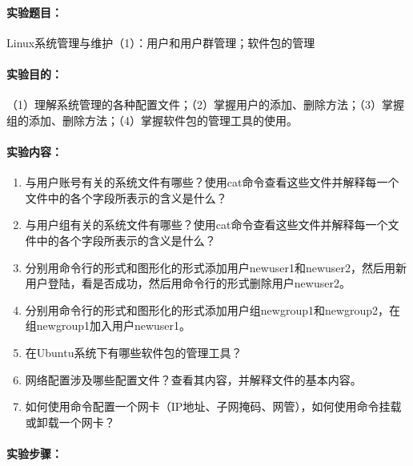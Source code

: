 \documentclass[cs4size,a4paper,nofonts]{ctexart}
\def\titlec{Linux系统管理与维护（1）：用户和用户群管理；软件包的管理}
\begin{document}




\paragraph{实验题目：}\titlec

\paragraph{实验目的：}
（1）理解系统管理的各种配置文件；（2）掌握用户的添加、删除方法；（3）掌握组的添加、删除方法；（4）掌握软件包的管理工具的使用。

\paragraph{实验内容：}
\begin{enumerate}
\item 与用户账号有关的系统文件有哪些？使用cat命令查看这些文件并解释每一个文件中的各个字段所表示的含义是什么？
\item 与用户组有关的系统文件有哪些？使用cat命令查看这些文件并解释每一个文件中的各个字段所表示的含义是什么？
\item 分别用命令行的形式和图形化的形式添加用户newuser1和newuser2，然后用新用户登陆，看是否成功，然后用命令行的形式删除用户newuser2。
\item 分别用命令行的形式和图形化的形式添加用户组newgroup1和newgroup2，在组newgroup1加入用户newuser1。
\item 在Ubuntu系统下有哪些软件包的管理工具？
\item 网络配置涉及哪些配置文件？查看其内容，并解释文件的基本内容。
\item 如何使用命令配置一个网卡（IP地址、子网掩码、网管），如何使用命令挂载或卸载一个网卡？
\end{enumerate}

\paragraph{实验步骤：}

\newcommand{\image}[3][width=\textwidth]{
  \begin{minipage}[t]{0.5\textwidth}
    \centering
        \texttt{[image: images/exp6/\#2.png]}
    \caption{#3}
    \label{fig:#3}
  \end{minipage}
}
\end{document}
